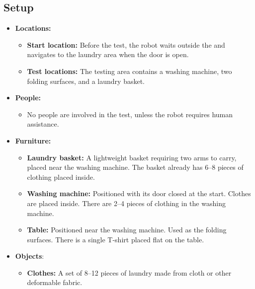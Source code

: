 \subsection*{Setup}
\begin{itemize}
    \item \textbf{Locations:}
        \begin{itemize}
            \item \textbf{Start location:} Before the test, the robot waits outside the \Arena{} and navigates to the laundry area when the door is open.
            \item \textbf{Test locations:} The testing area contains a washing machine, two folding surfaces, and a laundry basket.
        \end{itemize}
    \item \textbf{People:}
        \begin{itemize}
            \item No people are involved in the test, unless the robot requires human assistance.
        \end{itemize}
    \item \textbf{Furniture:}
        \begin{itemize}
            \item \textbf{Laundry basket:} A lightweight basket requiring two arms to carry, placed near the washing machine. The basket already has 6--8 pieces of clothing placed inside.
            \item \textbf{Washing machine:} Positioned with its door closed at the start. Clothes are placed inside. There are 2--4 pieces of clothing in the washing machine.
            \item \textbf{Table:} Positioned near the washing machine. Used as the folding surfaces. There is a single T-shirt placed flat on the table.
        \end{itemize}
    \item \textbf{Objects}:
        \begin{itemize}
            \item \textbf{Clothes:} A set of 8--12 pieces of laundry made from cloth or other deformable fabric.
        \end{itemize}
\end{itemize}

